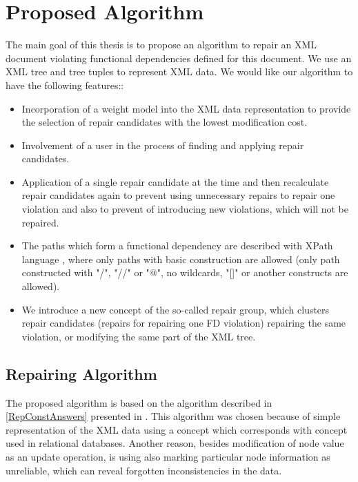 \chapter{Proposed Algorithm}\label{kap4}

The main goal of this thesis is to propose an algorithm to repair an XML document violating functional dependencies defined for this document. We use an XML tree and tree tuples to represent XML data. We would like our algorithm to have the following features::

\begin{itemize}
	\item Incorporation of a weight model into the XML data representation to provide the selection of repair candidates with the lowest modification cost.
    \item Involvement of a user in the process of finding and applying repair candidates.
    \item Application of a single repair candidate at the time and then recalculate repair candidates again to prevent using unnecessary repairs to repair one violation and also to prevent of introducing new violations, which will not be repaired.
    \item The paths which form a functional dependency are described with XPath language \cite{xpath}, where only paths with basic construction are allowed (only path constructed with "/", "//" or "@", no wildcards, "[]" or another constructs are allowed).
    \item We introduce a new concept of the so-called repair group, which clusters repair candidates (repairs for repairing one FD violation) repairing the same violation, or modifying the same part of the XML tree.
\end{itemize}


\section{Repairing Algorithm}

The proposed algorithm is based on the algorithm described in \ref{RepConstAnswers} presented in \cite{RepAndConsistentAnswer}. This algorithm was chosen because of simple representation of the XML data using a concept which corresponds with concept used in relational databases. Another reason, besides modification of node value as an update operation, is using also marking particular node information as unreliable, which can reveal forgotten inconsistencies in the data.

